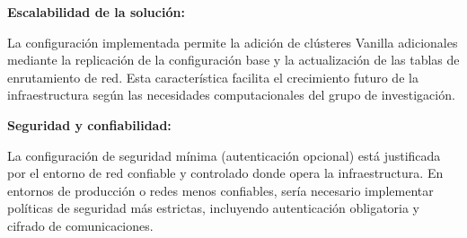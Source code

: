 \textbf{Escalabilidad de la solución:}

La configuración implementada permite la adición de clústeres Vanilla adicionales mediante la replicación de la configuración base y la actualización de las tablas de enrutamiento de red. Esta característica facilita el crecimiento futuro de la infraestructura según las necesidades computacionales del grupo de investigación.

\textbf{Seguridad y confiabilidad:}

La configuración de seguridad mínima (autenticación opcional) está justificada por el entorno de red confiable y controlado donde opera la infraestructura. En entornos de producción o redes menos confiables, sería necesario implementar políticas de seguridad más estrictas, incluyendo autenticación obligatoria y cifrado de comunicaciones.
